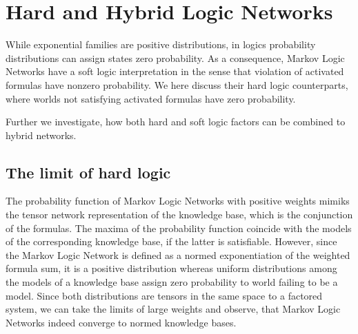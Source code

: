 \section{Hard and Hybrid Logic Networks}\label{cha:hardNetworks}





While exponential families are positive distributions, in logics probability distributions can assign states zero probability.
As a consequence, Markov Logic Networks have a soft logic interpretation in the sense that violation of activated formulas have nonzero probability.
We here discuss their hard logic counterparts, where worlds not satisfying activated formulas have zero probability.

Further we investigate, how both hard and soft logic factors can be combined to hybrid networks.




\subsection{The limit of hard logic}\label{sec:hardLogicLimit} %

The probability function of Markov Logic Networks with positive weights mimiks the tensor network representation of the knowledge base, which is the conjunction of the formulas. 
The maxima of the probability function coincide with the models of the corresponding knowledge base, if the latter is satisfiable.
However, since the Markov Logic Network is defined as a normed exponentiation of the weighted formula sum, it is a positive distribution whereas uniform distributions among the models of a knowledge base assign zero probability to world failing to be a model.
Since both distributions are tensors in the same space to a factored system, we can take the limits of large weights and observe, that Markov Logic Networks indeed converge to normed knowledge bases.


